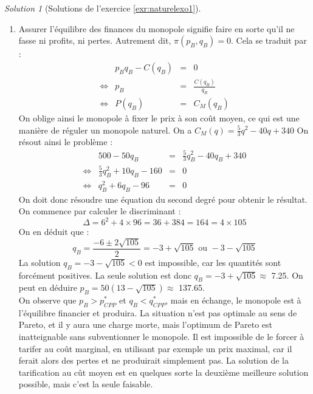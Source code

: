 \documentclass[
]{book}
\providecommand{\tightlist}{%
  \setlength{\itemsep}{0pt}\setlength{\parskip}{0pt}}
\theoremstyle{definition}
\theoremstyle{definition}
\theoremstyle{definition}
\theoremstyle{definition}
\theoremstyle{remark}
\newtheorem*{solution}{Solution}
\begin{document}
\begin{solution}[Solutions de l'exercice \ref{exr:naturelexo1}]
\begin{enumerate}
\def\labelenumi{\arabic{enumi}.}
\setcounter{enumi}{4}
\tightlist
\item
  Assurer l'équilibre des finances du monopole signifie faire en sorte qu'il ne fasse ni profits, ni pertes.
  Autrement dit, \(\pi(p_B, q_B)=0\).
  Cela se traduit par :
  \[
  \begin{array}{crcl}
  &p_Bq_B-C(q_B)&=&0 \\
  \Leftrightarrow & p_B&=&\frac{C(q_B)}{q_B}\\
  \Leftrightarrow & P(q_B)&=&C_M(q_B)
  \end{array}
  \]
  On oblige ainsi le monopole à fixer le prix à son coût moyen, ce qui est une manière de réguler un monopole naturel.
  On a \(C_M(q)=\frac{5}{3}q^2-40q+340\)
  On résout ainsi le problème :
  \[
  \begin{array}{crcl}
  &500-50q_B&=&\frac{5}{3}q_B^2-40q_B+340\\
  \Leftrightarrow & \frac{5}{3}q_B^2+10q_B-160&=&0\\
  \Leftrightarrow & q_B^2+6q_B-96&=&0
  \end{array}
  \]
  On doit donc résoudre une équation du second degré pour obtenir le résultat.
  On commence par calculer le discriminant :
  \[\Delta=6^2+4\times96=36+384=164=4\times105\]
  On en déduit que :
  \[q_B=\frac{-6\pm2\sqrt{105}}{2}=-3+\sqrt{105}\text{ ou } -3-\sqrt{105}\]
  La solution \(q_B=-3-\sqrt{105}<0\) est impossible, car les quantités sont forcément positives.
  La seule solution est donc \(q_{B}=-3+\sqrt{105}\approx\) 7.25.
  On peut en déduire \(p_{B}=50(13-\sqrt{105})\approx\) 137.65.\\
  On observe que \(p_B>p_{CPP}^*\) et \(q_B<q_{CPP}^*\), mais en échange, le monopole est à l'équilibre financier et produira.
  La situation n'est pas optimale au sens de Pareto, et il y aura une charge morte, mais l'optimum de Pareto est inatteignable sans subventionner le monopole.
  Il est impossible de le forcer à tarifer au coût marginal, en utilisant par exemple un prix maximal, car il ferait alors des pertes et ne produirait simplement pas.
  La solution de la tarification au cût moyen est en quelques sorte la deuxième meilleure solution possible, mais c'est la seule faisable.
\end{enumerate}

\end{solution}
\end{document}

